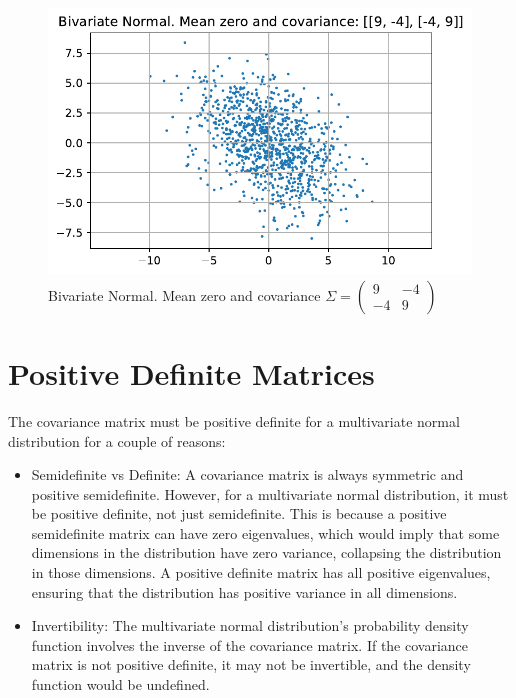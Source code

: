 \documentclass[
  letterpaper,
  DIV=11,
  numbers=noendperiod]{scrreprt}
\providecommand{\tightlist}{%
  \setlength{\itemsep}{0pt}\setlength{\parskip}{0pt}}\usepackage{longtable,booktabs,array}
\begin{document}
\begin{figure}

{\centering \includegraphics{006_num_gp_files/figure-pdf/fig-bi9449-output-1.pdf}

}

\caption{\label{fig-bi9449}Bivariate Normal. Mean zero and covariance
\(\Sigma=\begin{pmatrix} 9 & -4 \\ -4 & 9\end{pmatrix}\)}

\end{figure}

\hypertarget{positive-definite-matrices}{%
\section{Positive Definite Matrices}\label{positive-definite-matrices}}

The covariance matrix must be positive definite for a multivariate
normal distribution for a couple of reasons:

\begin{itemize}
\tightlist
\item
  Semidefinite vs Definite: A covariance matrix is always symmetric and
  positive semidefinite. However, for a multivariate normal
  distribution, it must be positive definite, not just semidefinite.
  This is because a positive semidefinite matrix can have zero
  eigenvalues, which would imply that some dimensions in the
  distribution have zero variance, collapsing the distribution in those
  dimensions. A positive definite matrix has all positive eigenvalues,
  ensuring that the distribution has positive variance in all
  dimensions.
\item
  Invertibility: The multivariate normal distribution's probability
  density function involves the inverse of the covariance matrix. If the
  covariance matrix is not positive definite, it may not be invertible,
  and the density function would be undefined.
\end{itemize}
\end{document}
